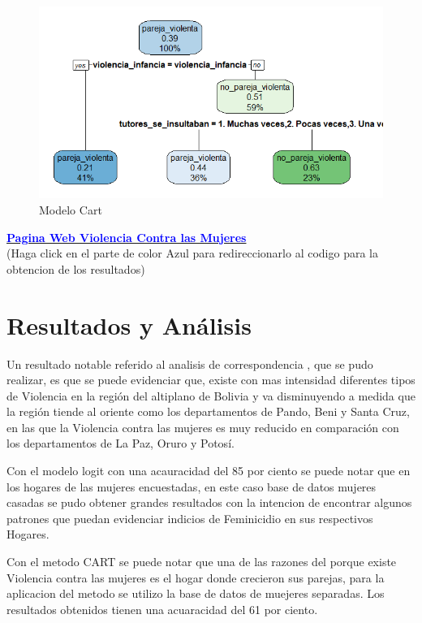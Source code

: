 \documentclass[11pt,letter]{article}
\begin{document}
\begin{figure}[!htp]
    \centering
    \includegraphics[scale=0.8]{cart.png}
    \caption{Modelo Cart}
    \label{f1_cart}
\end{figure}

\href{https://ealaurel.github.io/mi_proyecto1_EST_384/proy_MineriaDatos/metodo_cart.html/}{\textbf{\textcolor{blue}{Pagina Web Violencia Contra las Mujeres}}}
\\(Haga click en el parte de color Azul para redireccionarlo al codigo para la obtencion de los resultados)

\newpage

\section{Resultados y Análisis}


Un resultado notable referido al analisis de correspondencia , que se pudo realizar, es que se puede evidenciar que, existe con mas intensidad diferentes tipos de Violencia en la región del altiplano de Bolivia y va disminuyendo a medida que la región tiende al oriente como los departamentos de Pando, Beni y Santa Cruz, en las que la Violencia contra las mujeres es muy reducido en comparación con los departamentos de La Paz, Oruro y Potosí.

Con el modelo logit con una acauracidad del 85 por ciento se puede notar que en los hogares de las mujeres encuestadas, en este caso base de datos mujeres casadas se pudo obtener grandes resultados con la intencion de encontrar algunos patrones que puedan evidenciar indicios de Feminicidio en sus respectivos Hogares.  

Con el metodo CART se puede notar que una de las razones del porque existe Violencia contra las mujeres es el hogar donde crecieron sus parejas, para la aplicacion del metodo se utilizo la base de datos de muejeres separadas. Los resultados obtenidos tienen una acuaracidad del 61 por ciento. 
\end{document}
